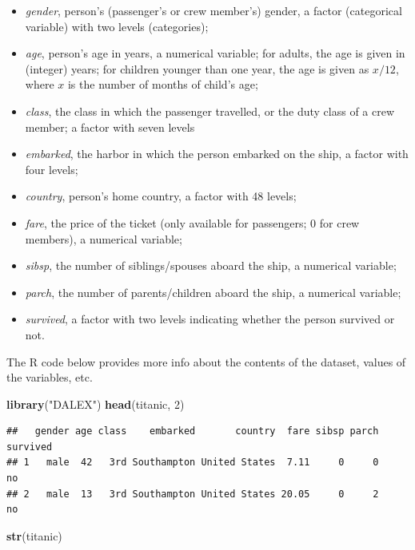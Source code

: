 \documentclass[12pt,]{krantz}
\newenvironment{Shaded}{\begin{snugshade}}{\end{snugshade}}
\newcommand{\DecValTok}[1]{\textcolor[rgb]{0.00,0.00,0.81}{#1}}
\newcommand{\KeywordTok}[1]{\textcolor[rgb]{0.13,0.29,0.53}{\textbf{#1}}}
\newcommand{\NormalTok}[1]{#1}
\newcommand{\StringTok}[1]{\textcolor[rgb]{0.31,0.60,0.02}{#1}}
\providecommand{\tightlist}{%
  \setlength{\itemsep}{0pt}\setlength{\parskip}{0pt}}
\begin{document}
\begin{itemize}
\tightlist
\item
  \emph{gender}, person's (passenger's or crew member's) gender, a factor (categorical variable) with two levels (categories);
\item
  \emph{age}, person's age in years, a numerical variable; for adults, the age is given in (integer) years; for children younger than one year, the age is given as \(x/12\), where \(x\) is the number of months of child's age;
\item
  \emph{class}, the class in which the passenger travelled, or the duty class of a crew member; a factor with seven levels
\item
  \emph{embarked}, the harbor in which the person embarked on the ship, a factor with four levels;
\item
  \emph{country}, person's home country, a factor with 48 levels;
\item
  \emph{fare}, the price of the ticket (only available for passengers; 0 for crew members), a numerical variable;
\item
  \emph{sibsp}, the number of siblings/spouses aboard the ship, a numerical variable;
\item
  \emph{parch}, the number of parents/children aboard the ship, a numerical variable;
\item
  \emph{survived}, a factor with two levels indicating whether the person survived or not.
\end{itemize}

The R code below provides more info about the contents of the dataset, values of the variables, etc.

\begin{Shaded}
\begin{Highlighting}[]
\KeywordTok{library}\NormalTok{(}\StringTok{"DALEX"}\NormalTok{)}
\KeywordTok{head}\NormalTok{(titanic, }\DecValTok{2}\NormalTok{)}
\end{Highlighting}
\end{Shaded}

\begin{verbatim}
##   gender age class    embarked       country  fare sibsp parch survived
## 1   male  42   3rd Southampton United States  7.11     0     0       no
## 2   male  13   3rd Southampton United States 20.05     0     2       no
\end{verbatim}

\begin{Shaded}
\begin{Highlighting}[]
\KeywordTok{str}\NormalTok{(titanic)}
\end{Highlighting}
\end{Shaded}
\end{document}
